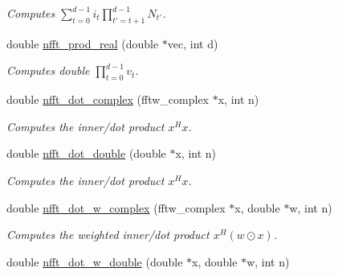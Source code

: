 \begin{CompactItemize}
\begin{CompactList}\small\item\em Computes $\sum_{t=0}^{d-1} i_t \prod_{t'=t+1}^{d-1} N_{t'}$. \item\end{CompactList}\item 
\hypertarget{group__nfftutil_gd7bad7074a695341742f57526f8695eb}{
double \hyperlink{group__nfftutil_gd7bad7074a695341742f57526f8695eb}{nfft\_\-prod\_\-real} (double $\ast$vec, int d)}
\label{group__nfftutil_gd7bad7074a695341742f57526f8695eb}

\begin{CompactList}\small\item\em Computes double $\prod_{t=0}^{d-1} v_t$. \item\end{CompactList}\item 
\hypertarget{group__nfftutil_g135eb6c5a8ae1a84ea64c9099caac004}{
double \hyperlink{group__nfftutil_g135eb6c5a8ae1a84ea64c9099caac004}{nfft\_\-dot\_\-complex} (fftw\_\-complex $\ast$x, int n)}
\label{group__nfftutil_g135eb6c5a8ae1a84ea64c9099caac004}

\begin{CompactList}\small\item\em Computes the inner/dot product $x^H x$. \item\end{CompactList}\item 
\hypertarget{group__nfftutil_g02357d8d67d2591573089e49958855a5}{
double \hyperlink{group__nfftutil_g02357d8d67d2591573089e49958855a5}{nfft\_\-dot\_\-double} (double $\ast$x, int n)}
\label{group__nfftutil_g02357d8d67d2591573089e49958855a5}

\begin{CompactList}\small\item\em Computes the inner/dot product $x^H x$. \item\end{CompactList}\item 
\hypertarget{group__nfftutil_gc712b4a91652e20dc53719ce6fc1f9e1}{
double \hyperlink{group__nfftutil_gc712b4a91652e20dc53719ce6fc1f9e1}{nfft\_\-dot\_\-w\_\-complex} (fftw\_\-complex $\ast$x, double $\ast$w, int n)}
\label{group__nfftutil_gc712b4a91652e20dc53719ce6fc1f9e1}

\begin{CompactList}\small\item\em Computes the weighted inner/dot product $x^H (w \odot x)$. \item\end{CompactList}\item 
\hypertarget{group__nfftutil_g69cceec47679c500072d3d60c6181b39}{
double \hyperlink{group__nfftutil_g69cceec47679c500072d3d60c6181b39}{nfft\_\-dot\_\-w\_\-double} (double $\ast$x, double $\ast$w, int n)}
\label{group__nfftutil_g69cceec47679c500072d3d60c6181b39}


\end{CompactItemize}
